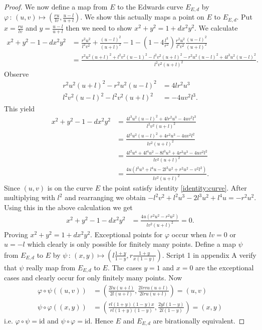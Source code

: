 \begin{proof}
We now define a map from $E$ to the Edwards curve $E_{E,d}$ by $\varphi\, :\, (u,v)\mapsto \left(\frac{ru}{lv},\frac{u-l}{u+l}\right)$. We show this actually maps a point on $E$ to $E_{E,d}$. Put $x=\frac{ru}{lv}$ and $y=\frac{u-l}{u+l}$ then we need to show $x^2+y^2=1+dx^2y^2$. We calculate
\begin{align*}
 x^2+y^2-1-dx^2y^2 &= \frac{r^2u^2}{l^2v^2}+\frac{(u-l)^2}{(u+l)^2}-1-\left(1-4\frac{l^3}{r^2}\right)\frac{r^2u^2}{l^2v^2}\frac{(u-l)^2}{(u+l)^2} \\
 &= \frac{r^2u^2(u+l)^2+l^2v^2(u-1)^2-l^2v^2(u+l)^2-r^2u^2(u-l)^2+4l^3u^2(u-l)^2}{l^2v^2(u+l)^2}.
\end{align*}
Observe 
\begin{align*}
r^2u^2(u+l)^2-r^2u^2(u-l)^2 &= 4lr^2u^3\\
l^2v^2(u-l)^2-l^2v^2(u+l)^2 &= -4uv^2l^3.
\end{align*}
This yield
\begin{align*}
x^2+y^2-1-dx^2y^2 &= \frac{4l^3u^2(u-l)^2+4lr^2u^3-4uv^2l^3}{l^2v^2(u+l)^2} \\
&= \frac{4l^2u^2(u-l)^2+4r^2u^3-4uv^2l^2}{lv^2(u+l)^2} \\
&= \frac{4l^2u^4+4l^4u^2-8l^3u^3+4r^2u^3-4uv^2l^2}{lv^2(u+l)^2}\\
&= \frac{4u(l^2u^3+l^4u-2l^3u^2+r^2u^2-v^2l^2)}{lv^2(u+l)^2}.
\end{align*}
Since $(u,v)$ is on the curve $E$ the point satisfy identity \ref{identity:curve}. After multiplying with $l^2$ and rearranging we obtain $-l^2v^2+l^2u^3-2l^3u^2+l^4u=-r^2u^2$. Using this in the above calculation we get
\begin{align*}
	x^2+y^2-1-dx^2y^2 &= \frac{4u(r^2u^2-r^2u^2)}{lv^2(u+l)^2} = 0.
\end{align*}
Proving $x^2+y^2=1+dx^2y^2$. Exceptional points for $\varphi$ occur when $lv=0$ or $u=-l$ which clearly is only possible for finitely many points. Define a map $\psi$ from $E_{E,d}$ to $E$ by $\psi\, :\, (x,y)\mapsto \left(l\frac{1+y}{1-y},r\frac{1+y}{x(1-y)}\right)$. Script 1 in appendix A verify that $\psi$ really map from $E_{E,d}$ to $E$. The cases $y=1$ and $x=0$ are the exceptional cases and clearly occur for only finitely many points. Now
\begin{align*}
\varphi\circ\psi((u,v))&=\left(\frac{2lu(u+l)}{2l(u+l)},\frac{2lrvu(u+l)}{2lru(u+l)}\right)=(u,v) \\
\psi\circ\varphi((x,y))&=\left(\frac{rl(1+y)(1-y)x}{rl(1+y)(1-y)},\frac{2yl(1-y)}{2l(1-y)}\right)=(x,y)
\end{align*}
i.e. $\varphi \circ \psi=\text{id}$ and $\psi\circ\varphi=\text{id}$. Hence $E$ and $E_{E,d}$ are birationally equivalent. 
\end{proof}
